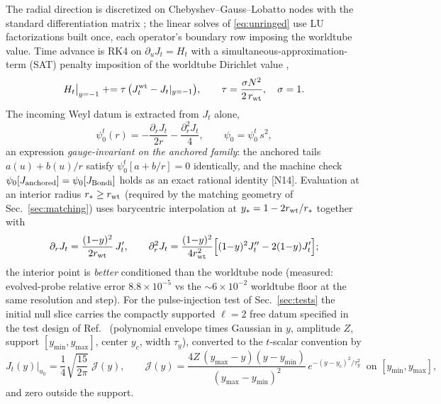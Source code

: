 \begin{nfblock}
The radial direction is discretized on Chebyshev--Gauss--Lobatto nodes
with the standard differentiation matrix \cite{Trefethen:2000}; the linear solves of
\eqref{eq:unringed} use LU factorizations built once, each operator's
boundary row imposing the worldtube value. Time advance is RK4 on
$\partial_u J_t = H_t$ with a simultaneous-approximation-term (SAT) penalty imposition of the
worldtube Dirichlet value \cite{Carpenter:1994},
\begin{equation}
H_t\big|_{y=-1} \mathrel{+}= \tau\,\big(J_t^{\rm wt} - J_t|_{y=-1}\big),
\qquad
\tau = \frac{\sigma N^2}{2\,r_{\rm wt}},\quad \sigma = 1 .
\label{eq:sat}
\end{equation}
The incoming Weyl datum is extracted from $J_t$ alone,
\begin{equation}
\psi_0^t(r) = -\frac{\partial_r J_t}{2r} - \frac{\partial_r^2 J_t}{4},
\qquad
\psi_0 = \psi_0^t\,s^2,
\label{eq:psi0formula}
\end{equation}
an expression \emph{gauge-invariant on the anchored family}: the
anchored tails $a(u) + b(u)/r$ satisfy $\psi_0^t[a + b/r] = 0$
identically, and the machine check
$\psi_0[J_{\rm anchored}] = \psi_0[J_{\rm Bondi}]$ holds as an exact
rational identity [N14]. Evaluation at an interior radius
$r_*\ge r_{\rm wt}$ (required by the matching geometry of
Sec.~\ref{sec:matching}) uses barycentric interpolation at
$y_* = 1 - 2r_{\rm wt}/r_*$ together with
\begin{equation}
\partial_r J_t = \frac{(1{-}y)^2}{2r_{\rm wt}}\,J_t',
\qquad
\partial_r^2 J_t = \frac{(1{-}y)^2}{4r_{\rm wt}^2}
 \Big[(1{-}y)^2 J_t'' - 2(1{-}y)J_t'\Big];
\label{eq:proberules}
\end{equation}
the interior point is \emph{better} conditioned than the worldtube node
(measured: evolved-probe relative error $8.8\times10^{-5}$ vs the
$\sim\!6\times10^{-2}$ worldtube floor at the same resolution and step).
For the pulse-injection test of Sec.~\ref{sec:tests} the initial null
slice carries the compactly supported $\ell=2$ free datum specified in
the test design of Ref.~\cite{Ma:2023qjn} (polynomial envelope times
Gaussian in $y$, amplitude $Z$, support $[y_{\min},y_{\max}]$, center
$y_c$, width $\tau_y$), converted to the $t$-scalar convention by
\begin{equation}
J_t(y)\big|_{u_0} = \frac14\sqrt{\frac{15}{2\pi}}\;\mathcal J(y),
\qquad
\mathcal J(y) = \frac{4Z\,(y_{\max}-y)(y-y_{\min})}
{(y_{\max}-y_{\min})^2}\,e^{-(y-y_c)^2/\tau_y^2}
\;\;\text{on } [y_{\min},y_{\max}],
\label{eq:pulseid}
\end{equation}
and zero outside the support.
\end{nfblock}

